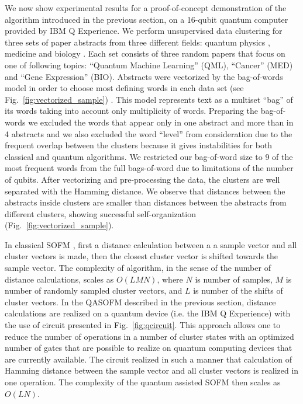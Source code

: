 \documentclass[pra,showkeys,twocolumn,showpacs]{revtex4-1}
\begin{document}
We now show experimental results for a proof-of-concept demonstration of the algorithm introduced in the previous section, on a 16-qubit quantum computer provided by IBM Q Experience.  
We perform unsupervised data clustering for three sets of paper abstracts from three different fields: 
quantum physics \cite{qml0, qml1, qml2}, 
medicine \cite{med0, med1, med2} 
and biology \cite{bio0, bio1, bio2}. 
Each set consists of three random papers that focus on one of following topics: 
``Quantum Machine Learning'' (QML), 
``Cancer'' (MED) 
and ``Gene Expression'' (BIO). 
Abstracts were vectorized by the bag-of-words \cite{weikang2016} model in order to choose most defining words in each data set (see Fig.~\ref{fig:vectorized_sample}) \cite{mctear2016}.  
This model represents text as a multiset ``bag'' of its words taking into account only multiplicity of words. 
Preparing the bag-of-words we excluded the words that appear only in one abstract and more than in 4 abstracts and we also excluded the word ``level'' from consideration due to the frequent overlap between the clusters because it gives instabilities for both classical and quantum algorithms. 
We restricted our bag-of-word size to 9 of the most frequent words from the full bags-of-word  due to limitations of the number of qubits. 
After vectorizing and pre-processing  the data, the clusters are well separated with the Hamming distance.  
We observe that distances between the abstracts inside clusters are smaller than distances between the abstracts from different clusters, 
showing successful self-organization (Fig.~\ref{fig:vectorized_sample}). 


In classical SOFM \cite{kohonen1990}, first a distance calculation between a a sample vector and all cluster vectors is made, 
then the closest cluster vector is shifted towards the sample vector. 
The complexity of algorithm, in the sense of the number of distance calculations, scales as $O(LMN)$, 
where $N$ is number of samples, 
$M$ is number of randomly sampled cluster vectors, 
and $L$ is number of the shifts of cluster vectors.  
In the QASOFM described in the previous section, distance calculations are realized on a quantum device (i.e. the IBM Q Experience) with the use of circuit presented in Fig.~\ref{fig:qcircuit}. This approach allows one to reduce the number of operations in a number of cluster states with an optimized number of gates 
that are possible to realize on  quantum computing devices that are currently available. 
The circuit realized in such a manner 
that calculation of Hamming distance between the sample vector and all cluster vectors is realized in one operation. 
The complexity of the quantum assisted SOFM then scales as $O(LN)$. 
\end{document}
